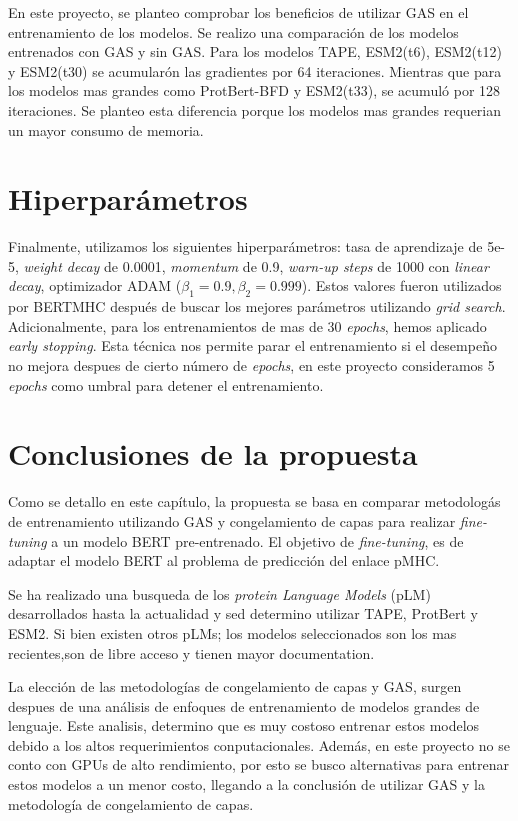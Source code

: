 En este proyecto, se planteo  comprobar los beneficios de utilizar GAS en el entrenamiento de los modelos. Se realizo una comparación de los modelos entrenados con GAS y sin GAS. Para los modelos TAPE, ESM2(t6), ESM2(t12) y ESM2(t30) se acumularón las gradientes por 64 iteraciones. Mientras que para los modelos mas grandes como ProtBert-BFD y ESM2(t33), se acumuló por 128 iteraciones. Se planteo esta diferencia porque los modelos mas grandes requerian un mayor consumo de memoria.


\section{Hiperparámetros}\label{sec:hyperparam}
Finalmente, utilizamos los siguientes hiperparámetros: tasa de aprendizaje de 5e-5, \textit{weight decay} de 0.0001, \textit{momentum} de 0.9, \textit{warn-up steps} de 1000 con \textit{linear decay}, optimizador ADAM ($\beta_1 = 0.9, \beta_2=0.999$). Estos valores fueron utilizados por BERTMHC \citep{cheng2021bertmhc} después de buscar los mejores parámetros utilizando \textit{grid search}. Adicionalmente, para los entrenamientos de mas de 30 \textit{epochs}, hemos aplicado  \textit{early stopping}. Esta técnica nos permite parar el entrenamiento si el desempeño no mejora despues de cierto número de \textit{epochs}, en este proyecto consideramos 5 \textit{epochs} como umbral para detener el entrenamiento.


\section{Conclusiones de la propuesta}

Como se detallo en este capítulo, la propuesta se basa en comparar metodologás de entrenamiento utilizando GAS y congelamiento de capas para realizar \textit{fine-tuning} a un modelo BERT pre-entrenado. El objetivo de \textit{fine-tuning}, es de adaptar el modelo BERT al problema de predicción del enlace pMHC.

Se ha realizado una busqueda de los \textit{protein Language Models} (pLM) desarrollados hasta la actualidad y sed determino utilizar TAPE, ProtBert y ESM2.  Si bien existen otros pLMs; los modelos seleccionados son los mas recientes,son de libre acceso y tienen mayor documentation. 

La elección de las metodologías de congelamiento de capas y GAS, surgen despues de una análisis de enfoques de entrenamiento de modelos grandes de lenguaje. Este analisis, determino que es muy costoso entrenar estos modelos debido a los altos requerimientos conputacionales. Además, en este proyecto no se conto con GPUs de alto rendimiento, por esto se busco alternativas para entrenar estos modelos a un menor costo, llegando a la conclusión de utilizar GAS y la metodología de congelamiento de capas.


